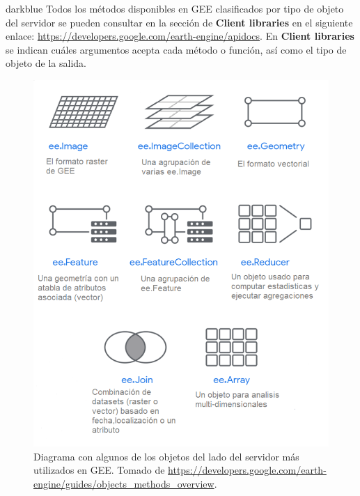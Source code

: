 \documentclass[
  12pt,
  letterpaper,
  twoside]{book}
\begin{document}
\begin{bluebox2}

\begin{awesomeblock}{5pt}{\faLightbulb}{darkblue}
Todos los métodos disponibles en GEE clasificados por tipo de objeto del servidor se pueden consultar en la sección de \textbf{Client libraries} en el siguiente enlace: \url{https://developers.google.com/earth-engine/apidocs}. En \textbf{Client libraries} se indican cuáles argumentos acepta cada método o función, así como el tipo de objeto de la salida.

\end{awesomeblock}

\end{bluebox2}



\begin{figure}[H]

{\centering \includegraphics[width=0.95\linewidth]{Img/objetosServ2} 

}

\caption{Diagrama con algunos de los objetos del lado del servidor más utilizados en GEE. Tomado de \url{https://developers.google.com/earth-engine/guides/objects_methods_overview}.}\label{fig:f56}
\end{figure}
\end{document}

